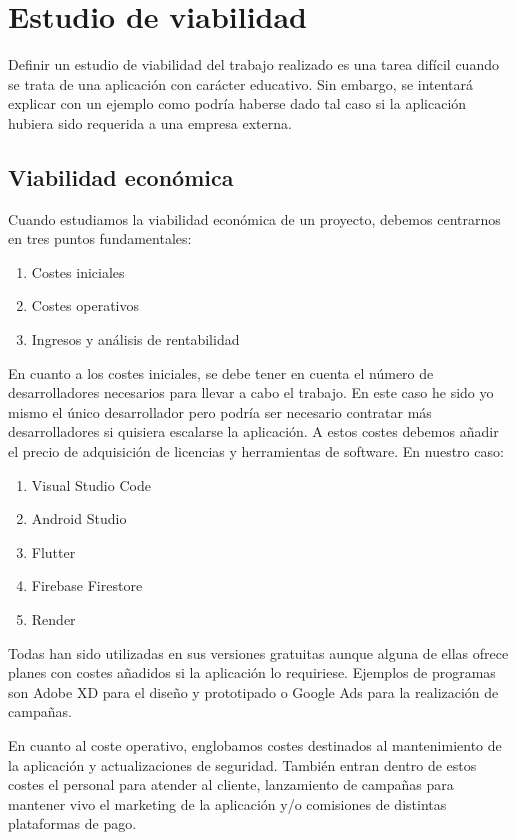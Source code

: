\section{Estudio de viabilidad}

	Definir un estudio de viabilidad del trabajo realizado es una tarea difícil cuando se trata de una aplicación con carácter educativo. Sin embargo, se intentará explicar con un ejemplo como podría haberse dado tal caso si la aplicación hubiera sido requerida a una empresa externa.

\subsection{Viabilidad económica}
	
	Cuando estudiamos la viabilidad económica de un proyecto, debemos centrarnos en tres puntos fundamentales:
	\begin{enumerate}
		\item Costes iniciales
		\item Costes operativos
		\item Ingresos y análisis de rentabilidad
	\end{enumerate}
	
	En cuanto a los costes iniciales, se debe tener en cuenta el número de desarrolladores necesarios para llevar a cabo el trabajo. En este caso he sido yo mismo el único desarrollador pero podría ser necesario contratar más desarrolladores si quisiera escalarse la aplicación. A estos costes debemos añadir el precio de adquisición de licencias y herramientas de software. En nuestro caso:
	\begin{enumerate}
		\item Visual Studio Code
		\item Android Studio
		\item Flutter
		\item Firebase Firestore
		\item Render
	\end{enumerate}
	Todas han sido utilizadas en sus versiones gratuitas aunque alguna de ellas ofrece planes con costes añadidos si la aplicación lo requiriese. Ejemplos de programas son Adobe XD para el diseño y prototipado o Google Ads para la realización de campañas.
	
	En cuanto al coste operativo, englobamos costes destinados al mantenimiento de la aplicación y actualizaciones de seguridad. También entran dentro de estos costes el personal para atender al cliente, lanzamiento de campañas para mantener vivo el marketing de la aplicación y/o comisiones de distintas plataformas de pago.
	
